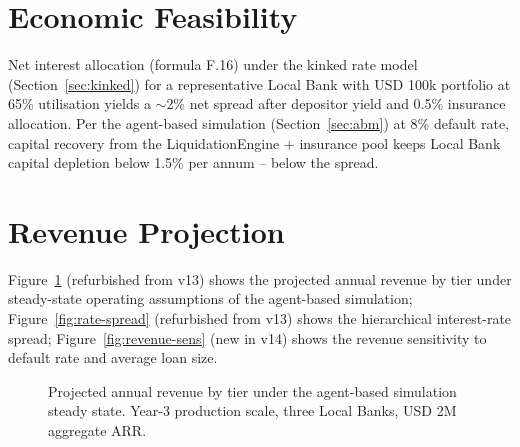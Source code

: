 \documentclass[12pt,a4paper]{report}
\providecommand{\Description}[1]{}
\begin{document}
\section{Economic Feasibility}
\label{sec:econ-feasibility}

Net interest allocation (formula F.16) under the kinked rate model (Section~\ref{sec:kinked}) for a representative Local Bank with USD 100k portfolio at 65\% utilisation yields a $\sim$2\% net spread after depositor yield and 0.5\% insurance allocation. Per the agent-based simulation (Section~\ref{sec:abm}) at 8\% default rate, capital recovery from the LiquidationEngine + insurance pool keeps Local Bank capital depletion below 1.5\% per annum -- below the spread.

\section{Revenue Projection}
\label{sec:revenue}

Figure~\ref{fig:revenue-tier} (refurbished from v13) shows the projected annual revenue by tier under steady-state operating assumptions of the agent-based simulation; Figure~\ref{fig:rate-spread} (refurbished from v13) shows the hierarchical interest-rate spread; Figure~\ref{fig:revenue-sens} (new in v14) shows the revenue sensitivity to default rate and average loan size.

\begin{figure}[!t]
\centering
{}
\Description{Bar chart of projected annual revenue by tier. World Bank approximately 480000 dollars, National Bank approximately 320000 dollars, Local Bank approximately 140000 dollars, Retail / Group approximately 40000 dollars.}
\caption{Projected annual revenue by tier under the agent-based simulation steady state. Year-3 production scale, three Local Banks, USD 2M aggregate ARR.}
\label{fig:revenue-tier}
\end{figure}
\end{document}

